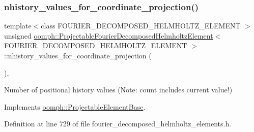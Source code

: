\subsubsection{\texorpdfstring{nhistory\+\_\+values\+\_\+for\+\_\+coordinate\+\_\+projection()}{nhistory\_values\_for\_coordinate\_projection()}}
{\footnotesize\ttfamily template$<$class F\+O\+U\+R\+I\+E\+R\+\_\+\+D\+E\+C\+O\+M\+P\+O\+S\+E\+D\+\_\+\+H\+E\+L\+M\+H\+O\+L\+T\+Z\+\_\+\+E\+L\+E\+M\+E\+NT $>$ \\
unsigned \hyperlink{classoomph_1_1ProjectableFourierDecomposedHelmholtzElement}{oomph\+::\+Projectable\+Fourier\+Decomposed\+Helmholtz\+Element}$<$ F\+O\+U\+R\+I\+E\+R\+\_\+\+D\+E\+C\+O\+M\+P\+O\+S\+E\+D\+\_\+\+H\+E\+L\+M\+H\+O\+L\+T\+Z\+\_\+\+E\+L\+E\+M\+E\+NT $>$\+::nhistory\+\_\+values\+\_\+for\+\_\+coordinate\+\_\+projection (\begin{DoxyParamCaption}{ }\end{DoxyParamCaption})\hspace{0.3cm}{\ttfamily [inline]}, {\ttfamily [virtual]}}



Number of positional history values (Note\+: count includes current value!) 



Implements \hyperlink{classoomph_1_1ProjectableElementBase_ab4ecd0cd24000a3ed675dc7198203c1f}{oomph\+::\+Projectable\+Element\+Base}.



Definition at line 729 of file fourier\+\_\+decomposed\+\_\+helmholtz\+\_\+elements.\+h.

\mbox{\label{classoomph_1_1ProjectableFourierDecomposedHelmholtzElement_ade916dec0e853569db95b0538fcabb2a}} 
